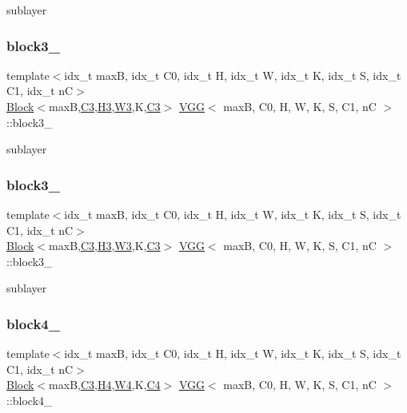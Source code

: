 sublayer \mbox{\label{structVGG_ae6f0d3f40c0c1f1f2fe656e446be7dd9}} 
\subsubsection{\texorpdfstring{block3\+\_}{block3\_2}}
{\footnotesize\ttfamily template$<$idx\+\_\+t maxB, idx\+\_\+t C0, idx\+\_\+t H, idx\+\_\+t W, idx\+\_\+t K, idx\+\_\+t S, idx\+\_\+t C1, idx\+\_\+t nC$>$ \\
\hyperlink{structBlock}{Block}$<$maxB,\hyperlink{structVGG_a88a35c950ca73035ad75644925c05061}{C3},\hyperlink{structVGG_aad221438514d3b1a829d7f9c27a6f5ea}{H3},\hyperlink{structVGG_ad3bde49e961175621e0937584dae0af0}{W3},K,\hyperlink{structVGG_a88a35c950ca73035ad75644925c05061}{C3}$>$ \hyperlink{structVGG}{V\+GG}$<$ maxB, C0, H, W, K, S, C1, nC $>$\+::block3\+\_}

sublayer \mbox{\label{structVGG_a8002c03bc72a210d6bba027abf770ee5}} 
\subsubsection{\texorpdfstring{block3\+\_}{block3\_3}}
{\footnotesize\ttfamily template$<$idx\+\_\+t maxB, idx\+\_\+t C0, idx\+\_\+t H, idx\+\_\+t W, idx\+\_\+t K, idx\+\_\+t S, idx\+\_\+t C1, idx\+\_\+t nC$>$ \\
\hyperlink{structBlock}{Block}$<$maxB,\hyperlink{structVGG_a88a35c950ca73035ad75644925c05061}{C3},\hyperlink{structVGG_aad221438514d3b1a829d7f9c27a6f5ea}{H3},\hyperlink{structVGG_ad3bde49e961175621e0937584dae0af0}{W3},K,\hyperlink{structVGG_a88a35c950ca73035ad75644925c05061}{C3}$>$ \hyperlink{structVGG}{V\+GG}$<$ maxB, C0, H, W, K, S, C1, nC $>$\+::block3\+\_}

sublayer \mbox{\label{structVGG_a1461b736e9753f364a317c8e6305bb45}} 
\subsubsection{\texorpdfstring{block4\+\_}{block4\_1}}
{\footnotesize\ttfamily template$<$idx\+\_\+t maxB, idx\+\_\+t C0, idx\+\_\+t H, idx\+\_\+t W, idx\+\_\+t K, idx\+\_\+t S, idx\+\_\+t C1, idx\+\_\+t nC$>$ \\
\hyperlink{structBlock}{Block}$<$maxB,\hyperlink{structVGG_a88a35c950ca73035ad75644925c05061}{C3},\hyperlink{structVGG_a1754afced5b0bbb91031179c1f58ee29}{H4},\hyperlink{structVGG_a9728cd3ccfa5011d2a795dff7e9abfe8}{W4},K,\hyperlink{structVGG_a4d54a1cc3e99340dfb67e7252719c663}{C4}$>$ \hyperlink{structVGG}{V\+GG}$<$ maxB, C0, H, W, K, S, C1, nC $>$\+::block4\+\_}

